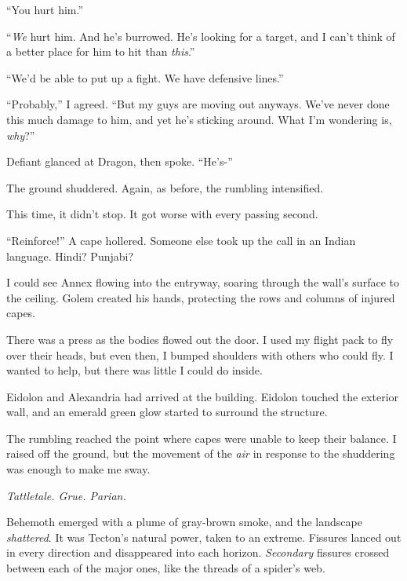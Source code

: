 ``You hurt him.''



``\emph{We} hurt him.  And he's burrowed.  He's looking for a target, and I can't think of a better place for him to hit than \emph{this}.''



``We'd be able to put up a fight.  We have defensive lines.''



``Probably,'' I agreed.  ``But my guys are moving out anyways.  We've never done this much damage to him, and yet he's sticking around.  What I'm wondering is, \emph{why}?''



Defiant glanced at Dragon, then spoke.  ``He's-''



The ground shuddered.  Again, as before, the rumbling intensified.



This time, it didn't stop.  It got worse with every passing second.



``Reinforce!''  A cape hollered.  Someone else took up the call in an Indian language.  Hindi?  Punjabi?



I could see Annex flowing into the entryway, soaring through the wall's surface to the ceiling.  Golem created his hands, protecting the rows and columns of injured capes.



There was a press as the bodies flowed out the door.  I used my flight pack to fly over their heads, but even then, I bumped shoulders with others who could fly.  I wanted to help, but there was little I could do inside.



Eidolon and Alexandria had arrived at the building.  Eidolon touched the exterior wall, and an emerald green glow started to surround the structure.



The rumbling reached the point where capes were unable to keep their balance.  I raised off the ground, but the movement of the \emph{air} in response to the shuddering was enough to make me sway.



\emph{Tattletale.  Grue.  Parian.}



Behemoth emerged with a plume of gray-brown smoke, and the landscape \emph{shattered}.  It was Tecton's natural power, taken to an extreme.  Fissures lanced out in every direction and disappeared into each horizon.  \emph{Secondary} fissures\emph{ }crossed between each of the major ones, like the threads of a spider's web.



